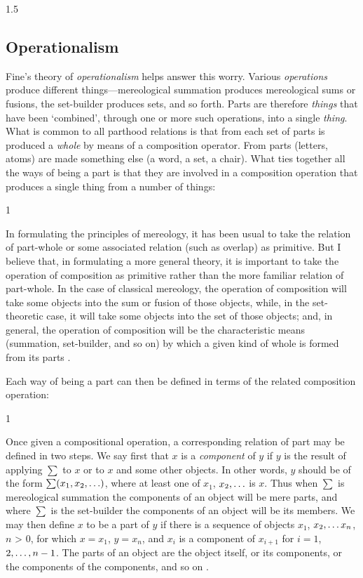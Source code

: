 \documentclass[11pt]{article}
\newenvironment{squote}{%
\begin{spacing}{1}
\begin{list}{}{%
\setlength{\labelwidth}{0pt}%
\rightmargin\leftmargin%
}
\item\relax
}{%
\end{list}%
\end{spacing}
}
\begin{document}
\begin{spacing}{1.5}
\subsection{Operationalism}
\label{operation}
Fine's theory of {\em operationalism} helps answer this worry.
Various {\em operations} produce different things---mereological
summation produces mereological sums or fusions, the set-builder
produces sets, and so forth.  Parts are therefore {\em things} that
have been `combined', through one or more such operations, into a
single {\em thing}.  What is common to all parthood relations is that
from each set of parts is produced a {\em whole} by means of a
composition operator.  From parts (letters, atoms) are made something
else (a word, a set, a chair).  What ties together all the ways of
being a part is that they are involved in a composition operation that
produces a single thing from a number of things:

\begin{squote}
In formulating the principles of mereology, it has been usual to take
the relation of part-whole or some associated relation (such as
overlap) as primitive.  But I believe that, in formulating a more
general theory, it is important to take the operation of composition
as primitive rather than the more familiar relation of part-whole.  In
the case of classical mereology, the operation of composition will
take some objects into the sum or fusion of those objects, while, in
the set-theoretic case, it will take some objects into the set of
those objects; and, in general, the operation of composition will be
the characteristic means (summation, set-builder, and so on) by which
a given kind of whole is formed from its parts \citep[565]{fine2010}.
\end{squote}

Each way of being a part can then be defined in terms of the related
composition operation:

\begin{squote}
Once given a compositional operation, a corresponding relation of part
may be defined in two steps.  We say first that $x$ is a {\em
  component} of $y$ if $y$ is the result of applying $\sum$ to $x$ or
to $x$ and some other objects.  In other words, $y$ should be of the
form $\sum (x_{1}, x_{2}, \mathellipsis )$, where at least one of
$x_1$, $x_2, \mathellipsis$ is $x$.  Thus when $\sum$ is mereological
summation the components of an object will be mere parts, and where
$\sum$ is the set-builder the components of an object will be its
members.  We may then define $x$ to be a part of $y$ if there is a
sequence of objects $x_1$, $x_2, \mathellipsis x_n$, $n$
\textgreater{} $0$, for which $x = x_1$, $y = x_n$, and $x_i$ is a
component of $x_{i+1}$ for $i = 1$, $2, \mathellipsis, n-1$. The parts
of an object are the object itself, or its components, or the
components of the components, and so on \citep[567--568]{fine2010}.
\end{squote}


\end{spacing}
\end{document}
